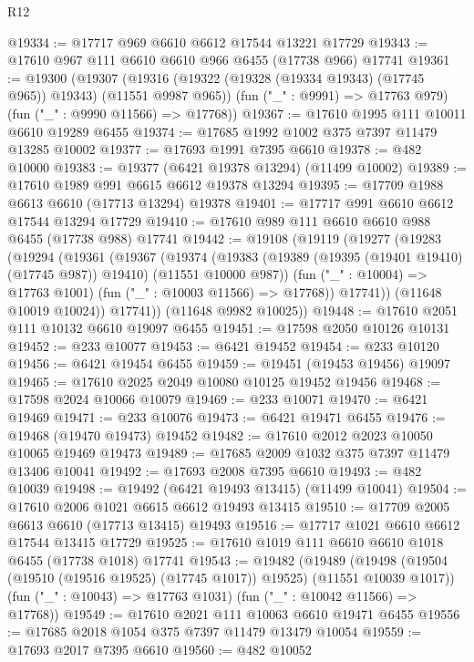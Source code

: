 \begin{lexlean}{R12}
\begin{coremodule}
{{{{{{{{{{{{{{{{{{{{{{{{{{{{{{{{{{{{{{{{{{{{{{{{{{{{{{{{{{{{{{{{{{{{{{{{{{{{{{{{{{@19334 := @17717 @969 @6610 @6612 @17544 @13221 @17729
@19343 := @17610 @967 @111 @6610 @6610 @966 @6455 (@17738 @966) @17741
@19361 := @19300
    (@19307
      (@19316 (@19322 (@19328 (@19334 @19343) (@17745 @965)) @19343) (@11551 @9987 @965))
      (fun ("_" : @9991) => @17763 @979)
      (fun ("_" : @9990 @11566) => @17768))
@19367 := @17610 @1995 @111 @10011 @6610 @19289 @6455
@19374 := @17685 @1992 @1002 @375 @7397 @11479 @13285 @10002
@19377 := @17693 @1991 @7395 @6610
@19378 := @482 @10000
@19383 := @19377 (@6421 @19378 @13294) (@11499 @10002)
@19389 := @17610 @1989 @991 @6615 @6612 @19378 @13294
@19395 := @17709 @1988 @6613 @6610 (@17713 @13294) @19378
@19401 := @17717 @991 @6610 @6612 @17544 @13294 @17729
@19410 := @17610 @989 @111 @6610 @6610 @988 @6455 (@17738 @988) @17741
@19442 := @19108
    (@19119
      (@19277
        (@19283
          (@19294
            (@19361
              (@19367
                (@19374
                  (@19383
                    (@19389 (@19395 (@19401 @19410) (@17745 @987)) @19410)
                    (@11551 @10000 @987))
                  (fun ("_" : @10004) => @17763 @1001)
                  (fun ("_" : @10003 @11566) => @17768))
                @17741))
            (@11648 @10019 @10024))
          @17741))
      (@11648 @9982 @10025))
@19448 := @17610 @2051 @111 @10132 @6610 @19097 @6455
@19451 := @17598 @2050 @10126 @10131
@19452 := @233 @10077
@19453 := @6421 @19452
@19454 := @233 @10120
@19456 := @6421 @19454 @6455
@19459 := @19451 (@19453 @19456) @19097
@19465 := @17610 @2025 @2049 @10080 @10125 @19452 @19456
@19468 := @17598 @2024 @10066 @10079
@19469 := @233 @10071
@19470 := @6421 @19469
@19471 := @233 @10076
@19473 := @6421 @19471 @6455
@19476 := @19468 (@19470 @19473) @19452
@19482 := @17610 @2012 @2023 @10050 @10065 @19469 @19473
@19489 := @17685 @2009 @1032 @375 @7397 @11479 @13406 @10041
@19492 := @17693 @2008 @7395 @6610
@19493 := @482 @10039
@19498 := @19492 (@6421 @19493 @13415) (@11499 @10041)
@19504 := @17610 @2006 @1021 @6615 @6612 @19493 @13415
@19510 := @17709 @2005 @6613 @6610 (@17713 @13415) @19493
@19516 := @17717 @1021 @6610 @6612 @17544 @13415 @17729
@19525 := @17610 @1019 @111 @6610 @6610 @1018 @6455 (@17738 @1018) @17741
@19543 := @19482
    (@19489
      (@19498 (@19504 (@19510 (@19516 @19525) (@17745 @1017)) @19525) (@11551 @10039 @1017))
      (fun ("_" : @10043) => @17763 @1031)
      (fun ("_" : @10042 @11566) => @17768))
@19549 := @17610 @2021 @111 @10063 @6610 @19471 @6455
@19556 := @17685 @2018 @1054 @375 @7397 @11479 @13479 @10054
@19559 := @17693 @2017 @7395 @6610
@19560 := @482 @10052
}}}}}}}}}}}}}}}}}}}}}}}}}}}}}}}}}}}}}}}}}}}}}}}}}}}}}}}}}}}}}}}}}}}}}}}}}}}}}}}}}}
\end{coremodule}
\end{lexlean}
